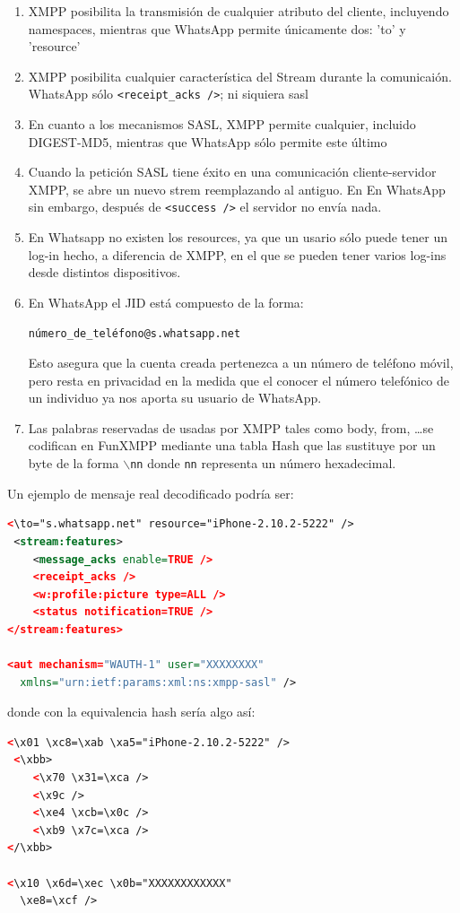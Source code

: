 \documentclass[a4paper, 11pt]{article} %
\begin{document}
\begin{enumerate}
 \item XMPP posibilita la transmisión de cualquier atributo del cliente, incluyendo namespaces, mientras que WhatsApp
  permite únicamente dos: 'to' y 'resource' %
 \item XMPP posibilita cualquier característica del Stream durante la comunicaión. WhatsApp sólo \texttt{<receipt\_acks />};
  ni siquiera sasl
 \item En cuanto a los mecanismos SASL, XMPP permite cualquier, incluido DIGEST-MD5, mientras que WhatsApp sólo permite 
  este último
 \item Cuando la petición SASL tiene éxito en una comunicación cliente-servidor XMPP, se abre un nuevo strem reemplazando al antiguo. En
  En WhatsApp sin embargo, después de \texttt{<success />} el servidor no envía nada.
 \item En Whatsapp no existen los resources, ya que un usario sólo puede tener un log-in hecho, a diferencia de XMPP, en
  el que se pueden tener varios log-ins desde distintos dispositivos.
 \item En WhatsApp el JID está compuesto de la forma:
   \begin{center}
    \texttt{número\_de\_teléfono@s.whatsapp.net}
   \end{center}
  Esto asegura que la cuenta creada pertenezca a un número de teléfono móvil, pero resta en privacidad en la medida
  que el conocer el número telefónico de un individuo ya nos aporta su usuario de WhatsApp.
 \item Las palabras reservadas de usadas por XMPP tales como body, from, \ldots se codifican en FunXMPP mediante
  una tabla Hash que las sustituye por un byte de la forma $\backslash$\texttt{nn} donde \texttt{nn} representa un número
  hexadecimal.
\end{enumerate}

Un ejemplo de mensaje real decodificado podría ser:

\begin{lstlisting}[language=XML] 
 <\to="s.whatsapp.net" resource="iPhone-2.10.2-5222" />
 <stream:features>
    <message_acks enable=TRUE />
    <receipt_acks />
    <w:profile:picture type=ALL />
    <status notification=TRUE />
</stream:features>

<aut mechanism="WAUTH-1" user="XXXXXXXX"
  xmlns="urn:ietf:params:xml:ns:xmpp-sasl" />
\end{lstlisting}

donde con la equivalencia hash sería algo así:
\begin{lstlisting}[language=XML] 
 <\x01 \xc8=\xab \xa5="iPhone-2.10.2-5222" />
 <\xbb>
    <\x70 \x31=\xca />
    <\x9c />
    <\xe4 \xcb=\x0c />
    <\xb9 \x7c=\xca />
</\xbb>

<\x10 \x6d=\xec \x0b="XXXXXXXXXXXX"
  \xe8=\xcf />
\end{lstlisting}
\end{document}
